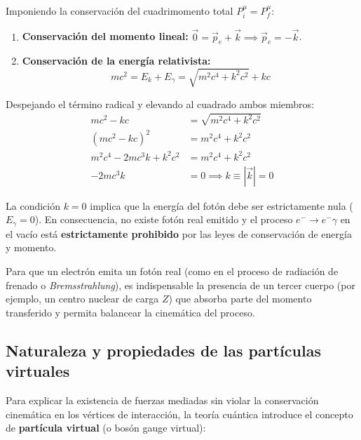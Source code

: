 Imponiendo la conservación del cuadrimomento total $P_i^\mu = P_f^\mu$:
\begin{enumerate}
    \item \textbf{Conservación del momento lineal:} $\vec{0} = \vec{p}_e + \vec{k} \implies \vec{p}_e = -\vec{k}$.
    \item \textbf{Conservación de la energía relativista:}
    \begin{equation}
        mc^2 = E_k + E_\gamma = \sqrt{m^2 c^4 + k^2 c^2} + kc
    \end{equation}
\end{enumerate}

Despejando el término radical y elevando al cuadrado ambos miembros:
\begin{align}
    mc^2 - kc &= \sqrt{m^2 c^4 + k^2 c^2} \nonumber \\
    (mc^2 - kc)^2 &= m^2 c^4 + k^2 c^2 \nonumber \\
    m^2 c^4 - 2 m c^3 k + k^2 c^2 &= m^2 c^4 + k^2 c^2 \nonumber \\
    -2 m c^3 k &= 0 \implies k \equiv |\vec{k}| = 0
\end{align}

\begin{concepto}
La condición $k = 0$ implica que la energía del fotón debe ser estrictamente nula ($E_\gamma = 0$). En consecuencia, no existe fotón real emitido y el proceso $e^- \to e^- \gamma$ en el vacío está \textbf{estrictamente prohibido} por las leyes de conservación de energía y momento.
\end{concepto}

Para que un electrón emita un fotón real (como en el proceso de radiación de frenado o \textit{Bremsstrahlung}), es indispensable la presencia de un tercer cuerpo (por ejemplo, un centro nuclear de carga $Z$) que absorba parte del momento transferido y permita balancear la cinemática del proceso.

\subsection*{Naturaleza y propiedades de las partículas virtuales}

Para explicar la existencia de fuerzas mediadas sin violar la conservación cinemática en los vértices de interacción, la teoría cuántica introduce el concepto de \textbf{partícula virtual} (o bosón gauge virtual):


